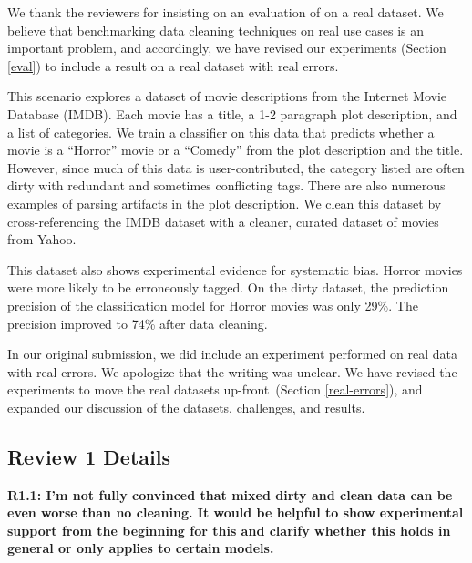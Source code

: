 \vspace{0.5em}

We thank the reviewers for insisting on an evaluation of \sys on a real dataset. We believe that benchmarking data cleaning techniques on real use cases is an important problem, and accordingly, we have revised our experiments (Section \ref{eval}) to include a result on a real dataset with real errors. 

This scenario explores a dataset of movie descriptions from the Internet Movie Database (IMDB). 
Each movie has a title, a 1-2 paragraph plot description, and a list of categories.
We train a classifier on this data that predicts whether a movie is a ``Horror'' movie or a ``Comedy'' from the plot description and the title.
However, since much of this data is user-contributed, the category listed are often dirty with redundant and sometimes conflicting tags.
There are also numerous examples of parsing artifacts in the plot description.
We clean this dataset by cross-referencing the IMDB dataset with a cleaner, curated dataset of movies from Yahoo.

This dataset also shows experimental evidence for systematic bias.
Horror movies were more likely to be erroneously tagged. 
On the dirty dataset, the prediction precision of the classification model for Horror movies was only 29\%.
The precision improved to 74\% after data cleaning.

In our original submission, we did include an experiment performed on real data with real errors. 
We apologize that the writing was unclear. We have revised the experiments to move the real datasets up-front~(Section \ref{real-errors}), and expanded our discussion of the datasets, challenges, and results.

\subsection*{Review 1 Details} 

\noindent\textbf{R1.1: I'm not fully convinced that mixed dirty and clean data can be even worse than no cleaning. It would be helpful to show experimental support from the beginning for this and clarify whether this holds in general or only applies to certain models.}

